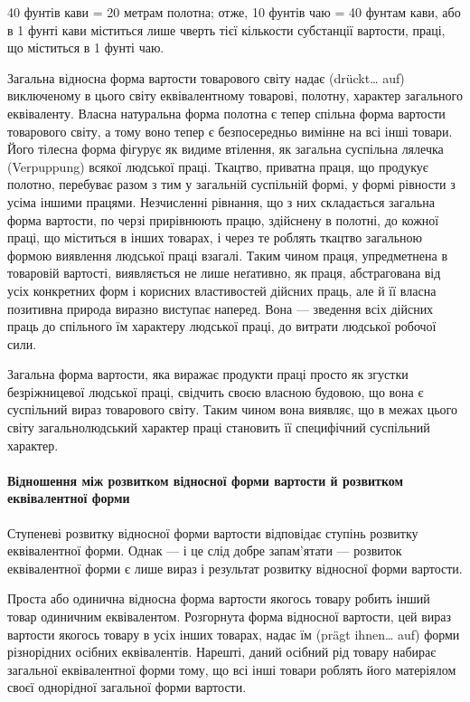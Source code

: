 \parcont{}  %
40 фунтів кави = 20 метрам полотна; отже, 10 фунтів чаю =
40 фунтам кави, або в 1 фунті кави міститься лише чверть тієї
кількости субстанції вартости, праці, що міститься в 1 фунті чаю.

Загальна відносна форма вартости товарового світу надає
(drückt\dots{} auf) виключеному в цього світу еквівалентному товарові,
полотну, характер загального еквіваленту. Власна натуральна
форма полотна є тепер спільна форма вартости товарового
світу, а тому воно тепер є безпосередньо вимінне на всі інші товари.
Його тілесна форма фігурує як видиме втілення, як загальна
суспільна лялечка (Verpuppung) всякої людської праці. Ткацтво,
приватна праця, що продукує полотно, перебуває разом з тим у
загальній суспільній формі, у формі рівности з усіма іншими
працями. Незчисленні рівнання, що з них складається загальна
форма вартости, по черзі прирівнюють працю, здійснену в полотні,
до кожної праці, що міститься в інших товарах, і через те роблять
ткацтво загальною формою виявлення людської праці взагалі.
Таким чином праця, упредметнена в товаровій вартості, виявляється
не лише неґативно, як праця, абстрагована від усіх конкретних
форм і корисних властивостей дійсних праць, але й її
власна позитивна природа виразно виступає наперед. Вона —
зведення всіх дійсних праць до спільного їм характеру людської
праці, до витрати людської робочої сили.

Загальна форма вартости, яка виражає продукти праці просто
як згустки безріжницевої людської праці, свідчить своєю власною
будовою, що вона є суспільний вираз товарового світу. Таким
чином вона виявляє, що в межах цього світу загальнолюдський
характер праці становить її специфічний суспільний характер.

\paragraph{Відношення між розвитком відносної форми вартости й розвитком
еквівалентної форми}

Ступеневі розвитку відносної форми вартости відповідає ступінь
розвитку еквівалентної форми. Однак — і це слід добре запам’ятати
— розвиток еквівалентної форми є лише вираз і результат
розвитку відносної форми вартости.

Проста або одинична відносна форма вартости якогось товару
робить інший товар одиничним еквівалентом. Розгорнута форма
відносної вартости, цей вираз вартости якогось товару в усіх
інших товарах, надає їм (prägt ihnen\dots{} auf) форми різнорідних
осібних еквівалентів. Нарешті, даний осібний рід товару набирає
загальної еквівалентної форми тому, що всі інші товари роблять
його матеріялом своєї однорідної загальної форми вартости.

